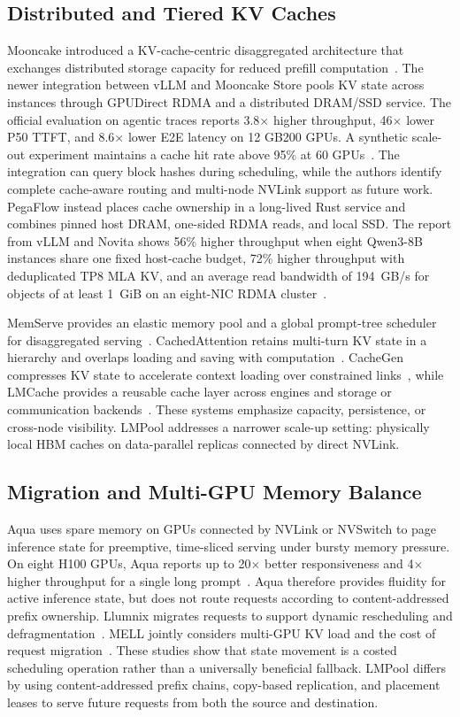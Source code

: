 \documentclass{article}
\newcommand{\sys}{LMPool}
\begin{document}
\subsection{Distributed and Tiered KV Caches}

Mooncake introduced a KV-cache-centric disaggregated architecture that exchanges distributed storage capacity for reduced prefill computation~\citep{Mooncake}. The newer integration between vLLM and Mooncake Store pools KV state across instances through GPUDirect RDMA and a distributed DRAM/SSD service. The official evaluation on agentic traces reports 3.8$\times$ higher throughput, 46$\times$ lower P50 TTFT, and 8.6$\times$ lower E2E latency on 12 GB200 GPUs. A synthetic scale-out experiment maintains a cache hit rate above 95\% at 60 GPUs~\citep{MooncakeStore}. The integration can query block hashes during scheduling, while the authors identify complete cache-aware routing and multi-node NVLink support as future work. PegaFlow instead places cache ownership in a long-lived Rust service and combines pinned host DRAM, one-sided RDMA reads, and local SSD. The report from vLLM and Novita shows 56\% higher throughput when eight Qwen3-8B instances share one fixed host-cache budget, 72\% higher throughput with deduplicated TP8 MLA KV, and an average read bandwidth of 194~GB/s for objects of at least 1~GiB on an eight-NIC RDMA cluster~\citep{PegaFlow}.

MemServe provides an elastic memory pool and a global prompt-tree scheduler for disaggregated serving~\citep{MemServe}. CachedAttention retains multi-turn KV state in a hierarchy and overlaps loading and saving with computation~\citep{CachedAttention}. CacheGen compresses KV state to accelerate context loading over constrained links~\citep{CacheGen}, while LMCache provides a reusable cache layer across engines and storage or communication backends~\citep{LMCache}. These systems emphasize capacity, persistence, or cross-node visibility. \sys{} addresses a narrower scale-up setting: physically local HBM caches on data-parallel replicas connected by direct NVLink.

\subsection{Migration and Multi-GPU Memory Balance}

Aqua uses spare memory on GPUs connected by NVLink or NVSwitch to page inference state for preemptive, time-sliced serving under bursty memory pressure. On eight H100 GPUs, Aqua reports up to 20$\times$ better responsiveness and 4$\times$ higher throughput for a single long prompt~\citep{Aqua}. Aqua therefore provides fluidity for active inference state, but does not route requests according to content-addressed prefix ownership. Llumnix migrates requests to support dynamic rescheduling and defragmentation~\citep{Llumnix}. MELL jointly considers multi-GPU KV load and the cost of request migration~\citep{MELL}. These studies show that state movement is a costed scheduling operation rather than a universally beneficial fallback. \sys{} differs by using content-addressed prefix chains, copy-based replication, and placement leases to serve future requests from both the source and destination.
\end{document}
